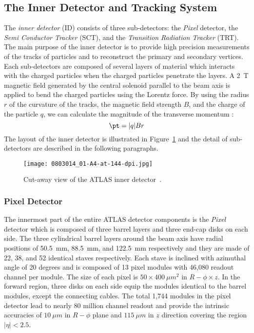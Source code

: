
\subsection{The Inner Detector and Tracking System}
\label{subsec:ae_inner_detector}
The \textit{inner detector} (ID) consists of three sub-detectors: the \textit{Pixel} detector, the \textit{Semi Conductor Tracker}  (SCT), and the \textit{Transition Radiation Tracker} (TRT).
The main purpose of the inner detector is to provide high precision measurements of the tracks of particles and to reconstruct the primary and secondary vertices.
Each sub-detectors are composed of several layers of material which interacts with the charged particles when the charged particles penetrate the layers.
A  2~T magnetic field generated by the central solenoid parallel to the beam axis is applied to bend the charged particles using the Lorentz force.
By using the radius $r$ of the curvature of the tracks, the magnetic field strength $B$, and the charge of the particle $q$, we can calculate the magnitude of the transverse momentum \pt:
%
\begin{equation}
\pt = |q|Br
\end{equation}
%
The layout of the inner detector is illustrated in Figure~\ref{fig:ae_inner_detector} and the detail of sub-detectors are described in the following paragraphs.

\begin{figure}[htbp]
\begin{center}
\texttt{[image: 0803014\_01-A4-at-144-dpi.jpg]}
\caption{Cut-away view of the ATLAS inner detector~\cite{1748-0221-3-08-S08003}.}
\label{fig:ae_inner_detector}
\end{center}
\end{figure}


\subsubsection{Pixel Detector}
\label{subsubsec:ae_pixel}
The innermost part of the entire ATLAS detector components is the \textit{Pixel} detector which is composed of three barrel layers and three end-cap disks on each side.
The three cylindrical barrel layers around the beam axis have radial positions of 50.5~mm, 88.5~mm, and 122.5~mm respectively and they are made of 22, 38, and 52 identical staves respectively.
Each stave is inclined with azimuthal angle of 20 degrees and is composed of 13 pixel modules with 46,080 readout channel per module.
The size of each pixel is $50 \times 400~\mu m^{2}$ in $R-\phi \times z$.
In the forward region, three disks on each side equip the modules identical to the barrel modules, except the connecting cables. 
The total 1,744 modules in the pixel detector lead to nearly 80 million channel readout and provide the intrinsic accuracies of $10~\mu m$ in $R-\phi$ plane and $115~\mu m$ in $z$ direction covering the region $|\eta| < 2.5$. 

